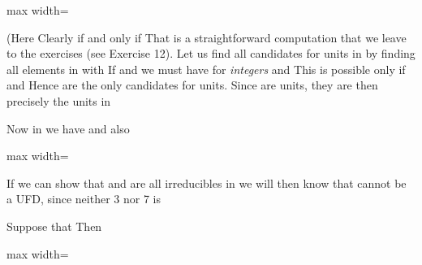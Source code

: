 \documentclass[11pt,oneside]{article}
\begin{document}
\begin{BookBody}

\begin{center}\begin{adjustbox}{max width=\linewidth}\end{adjustbox}\end{center}

(Here  Clearly if and only if  That  is a straightforward computation that we leave to the exercises (see Exercise 12). Let us find all candidates for units in  by finding all elements \BookInline{\alpha } in  with  If  and  we must have  for\textit{ integers}  and  This is possible only if  and  Hence  are the only candidates for units. Since  are units, they are then precisely the units in 

Now in  we have  and also

\begin{center}\begin{adjustbox}{max width=\linewidth}\end{adjustbox}\end{center}

If we can show that  and  are all irreducibles in  we will then know that  cannot be a UFD, since neither 3 nor 7 is 

Suppose that  Then

\begin{center}\begin{adjustbox}{max width=\linewidth}\end{adjustbox}\end{center}


\end{BookBody}
\end{document}
